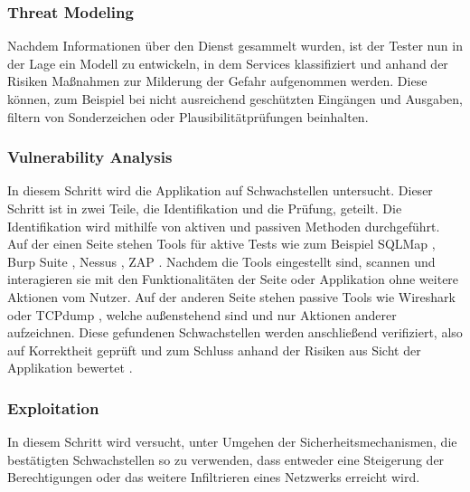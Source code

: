     \subsubsection{\glqq Threat Modeling\grqq{}}
        Nachdem Informationen über den Dienst gesammelt wurden, ist der Tester nun in der Lage ein Modell zu entwickeln, in dem Services klassifiziert und anhand der Risiken Maßnahmen zur Milderung der Gefahr aufgenommen werden. Diese können, zum Beispiel bei nicht ausreichend geschützten Eingängen und Ausgaben, filtern von Sonderzeichen oder Plausibilitätprüfungen beinhalten.
    \subsubsection{\glqq Vulnerability Analysis\grqq{}}
        In diesem Schritt wird die Applikation auf Schwachstellen untersucht. 
        Dieser Schritt ist in zwei Teile, die Identifikation und die Prüfung, geteilt.
        Die Identifikation wird mithilfe von aktiven und passiven Methoden durchgeführt.
        Auf der einen Seite stehen Tools für aktive Tests wie zum Beispiel 
        SQLMap \cite{damele_stampar_2014}, 
        Burp Suite \cite{LozanoCarlosA.author2019Hapt}, %
        Nessus \cite{BealeJay2008Nna}, %
        \ac{ZAP} \cite{bennetts2013owasp}. %
        Nachdem die Tools eingestellt sind, scannen und interagieren sie mit den Funktionalitäten der Seite oder Applikation ohne weitere Aktionen vom Nutzer.
        Auf der anderen Seite stehen passive Tools wie Wireshark oder TCPdump \cite{tcpdump_2010}, welche außenstehend sind und nur Aktionen anderer aufzeichnen. 
        Diese gefundenen Schwachstellen werden anschließend verifiziert, also auf Korrektheit geprüft und zum Schluss anhand der Risiken aus Sicht der Applikation bewertet \cite{hayes_2012}.
    \subsubsection{\glqq Exploitation\grqq{}}
        In diesem Schritt wird versucht, unter Umgehen der Sicherheitsmechanismen, die bestätigten Schwachstellen so zu verwenden, dass entweder eine Steigerung der Berechtigungen oder das weitere Infiltrieren eines Netzwerks erreicht wird.
